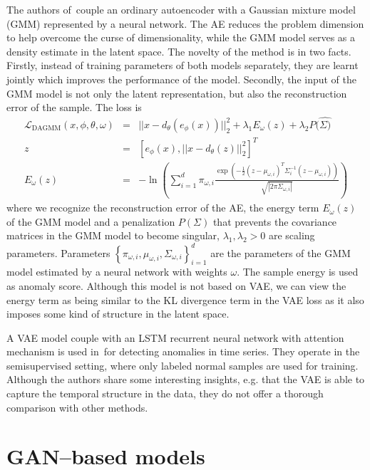 The authors of\,\cite{zong2018deep} couple an ordinary autoencoder
with a Gaussian mixture model (GMM) represented by a neural network.
The AE reduces the problem dimension to help overcome the curse of
dimensionality, while the GMM model serves as a density estimate in
the latent space. The novelty of the method is in two facts. Firstly,
instead of training parameters of both models separately, they are
learnt jointly which improves the performance of the model. Secondly,
the input of the GMM model is not only the latent representation,
but also the reconstruction error of the sample. The loss is 
\begin{eqnarray}
\mathcal{L}_{\text{DAGMM}}(x,\phi,\theta,\omega) & = & ||x-d_{\theta}(e_{\phi}(x))||_{2}^{2}+\lambda_{1}E_{\omega}(z)+\lambda_{2}P(\hat{\Sigma)}\\
z & = & \left[e_{\phi}(x),||x-d_{\theta}(z)||_{2}^{2}\right]^{T}\\
E_{\omega}(z) & = & -\ln\left(\sum_{i=1}^{d}\pi_{\omega,i}\frac{\exp\left(-\frac{1}{2}(z-\mu_{\omega,i})^{T}\Sigma_{i}^{-1}(z-\mu_{\omega,i})\right)}{\sqrt{|2\pi\Sigma_{\omega,i}|}}\right)
\end{eqnarray}
where we recognize the reconstruction error of the AE, the energy
term $E_{\omega}(z)$ of the GMM model and a penalization $P(\Sigma)$
that prevents the covariance matrices in the GMM model to become singular,
$\lambda_{1},\lambda_{2}>0$ are scaling parameters. Parameters $\left\{ \pi_{\omega,i},\mu_{\omega,i},\Sigma_{\omega,i}\right\} _{i=1}^{d}$
are the parameters of the GMM model estimated by a neural network
with weights $\omega$. The sample energy is used as anomaly score.
Although this model is not based on VAE, we can view the energy term
as being similar to the KL divergence term in the VAE loss as it also
imposes some kind of structure in the latent space.

A VAE model couple with an LSTM recurrent neural network with attention
mechanism is used in\,\cite{pereira2018unsupervised} for detecting
anomalies in time series. They operate in the semisupervised setting,
where only labeled normal samples are used for training. Although
the authors share some interesting insights, e.g. that the VAE is
able to capture the temporal structure in the data, they do not offer
a thorough comparison with other methods.

\section{GAN--based models}

